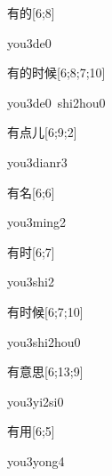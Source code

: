 \begin{verbete}[you3de0]{有的}[6;8]
\begin{pronuncia}{you3de0}
\end{pronuncia}
\end{verbete}

\begin{verbete}{有的时候}[6;8;7;10]
\begin{pronuncia}[\\]{you3de0\ shi2hou0}
\end{pronuncia}
\end{verbete}

\begin{verbete}{有点儿}[6;9;2]
\begin{pronuncia}{you3dianr3}
\end{pronuncia}
\end{verbete}

\begin{verbete}{有名}[6;6]
\begin{pronuncia}{you3ming2}
\end{pronuncia}
\end{verbete}

\begin{verbete}{有时}[6;7]
\begin{pronuncia}{you3shi2}
\end{pronuncia}
\end{verbete}

\begin{verbete}{有时候}[6;7;10]
\begin{pronuncia}{you3shi2hou0}
\end{pronuncia}
\end{verbete}

\begin{verbete}[you3yi2si0]{有意思}[6;13;9]
\begin{pronuncia}{you3yi2si0}
\end{pronuncia}
\end{verbete}

\begin{verbete}{有用}[6;5]
\begin{pronuncia}{you3yong4}
\end{pronuncia}
\end{verbete}

